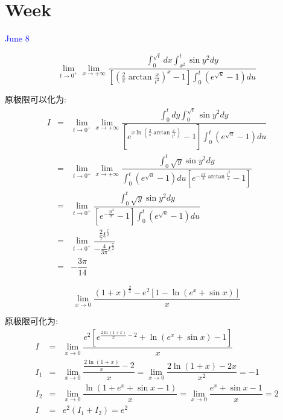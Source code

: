 \section{Week }
\textcolor{blue}{June 8}

\begin{example}[][Exam: 32.2.1]
	$$\lim\limits_{t\to 0^{+}}\lim\limits_{x\to+\infty}\dfrac{\int_{0}^{\sqrt{t}}dx\int_{x^2}^{t}\sin y^2dy}{\left[\left( \frac{2}{\pi}\arctan \frac{x}{t^2}\right)^{x}-1\right]\int_{0}^{t}(e^{\sqrt{u}}-1)du }$$
\end{example}

\begin{solution}
	
	原极限可以化为: 
	\begin{eqnarray*}
		I&=&\lim\limits_{t\to 0^{+}}\lim\limits_{x\to+\infty}\dfrac{\int_{0}^{t}dy\int_{0}^{\sqrt{t}}\sin y^2dy}{[e^{x\ln(\frac{2}{\pi}\arctan \frac{x}{t^2})}-1]\int_{0}^{t}(e^{\sqrt{u}}-1)du}\\
		&=&\lim\limits_{t\to 0^{+}}\lim\limits_{x\to+\infty}\dfrac{\int_{0}^{t}\sqrt{y}\sin y^2dy}{\int_{0}^{t}(e^{\sqrt{u}}-1)du[e^{-\frac{x\pi}{2}\arctan\frac{t^2}{x}}-1]}\\
		&=&\lim\limits_{t\to 0^{+}}\dfrac{\int_{0}^{t}\sqrt{y}\sin y^2dy}{[e^{-\frac{2t^2}{\pi}}-1]\int_{0}^{t}(e^{\sqrt{u}}-1)du}\\
		&=&\lim\limits_{t\to 0^{+}}\dfrac{\frac{2}{7}t^{\frac{7}{2}}}{-\frac{4}{3\pi}t^{\frac{7}{2}}}\\
		&=&-\dfrac{3\pi}{14}
	\end{eqnarray*}
\end{solution}

\begin{example}[][Exam: 32.2.2]
	$$\lim\limits_{x\to 0}\dfrac{(1+x)^{\frac{2}{x}}-e^2[1-\ln(e^x+\sin x)]}{x}$$
\end{example}

\begin{solution}
	
	原极限可化为: 
	\begin{eqnarray*}
		I&=&\lim\limits_{x\to 0}\dfrac{e^2[e^{\frac{2\ln(1+x)}{x}-2}+\ln(e^x+\sin x)-1]}{x}\\
		I_{1}&=&\lim\limits_{x\to 0}\dfrac{\frac{2\ln(1+x)}{x}-2}{x}=\lim\limits_{x\to 0}\dfrac{2\ln(1+x)-2x}{x^2}=-1\\
		I_{2}&=&\lim\limits_{x\to 0}\dfrac{\ln(1+e^x+\sin x-1)}{x}=\lim\limits_{x\to 0}\dfrac{e^x+\sin x-1}{x}=2\\
		I&=&e^2(I_{1}+I_{2})=e^2
	\end{eqnarray*}
\end{solution}


